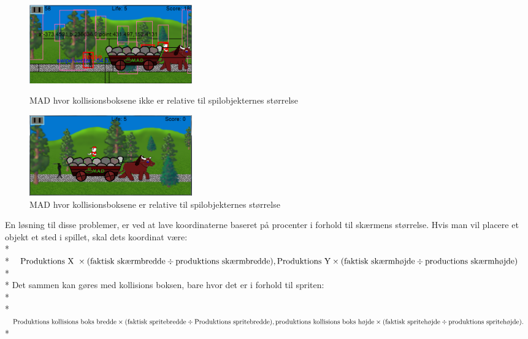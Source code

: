 \documentclass[Main.tex]{PositionOgSkalering}
\begin{document}
\begin{figure}[h]
\centering
\parbox{7cm}{   
\includegraphics[width = 7cm]{billeder/MADscaling5}
\caption{MAD hvor kollisionsboksene ikke er relative til spilobjekternes størrelse}    
\label{MADscaling5}}
\qquad
\begin{minipage}{7cm}
\includegraphics[width = 7cm]{billeder/MADscaling6}
\caption{MAD hvor kollisionsboksene er relative til spilobjekternes størrelse}    
\label{MADscaling6}
\end{minipage}
\end{figure}

En løsning til disse problemer, er ved at lave koordinaterne baseret på procenter i forhold til skærmens størrelse. Hvis man vil placere et objekt et sted i spillet, skal dets koordinat være: \\*\\*
\begin{math}
\text{Produktions X } \times (\text{faktisk skærmbredde} \div \text{produktions skærmbredde}), \\*
\text{Produktions Y} \times (\text{faktisk skærmhøjde} \div \text{productions skærmhøjde})\end{math} \\* \\*
Det sammen kan gøres med kollisions boksen, bare hvor det er i forhold til spriten:\\*\\*
\begin{math}\text{Produktions kollisions boks bredde} \times (\text{faktisk spritebredde} \div \text{Produktions spritebredde}),\\*
\text{produktions kollisions boks højde} \times (\text{faktisk spritehøjde} \div \text{produktions spritehøjde}).  \end{math}\\*
\end{document}
